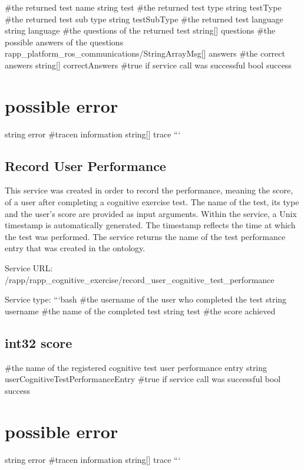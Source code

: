 \#the returned test name string test \#the returned test type string test\-Type \#the returned test sub type string test\-Sub\-Type \#the returned test language string language \#the questions of the returned test string\mbox{[}\mbox{]} questions \#the possible answers of the questions rapp\-\_\-platform\-\_\-ros\-\_\-communications/\-String\-Array\-Msg\mbox{[}\mbox{]} answers \#the correct answers string\mbox{[}\mbox{]} correct\-Answers \#true if service call was successful bool success \section*{possible error}

string error \#tracen information string\mbox{[}\mbox{]} trace ```

\subsection*{Record User Performance}

This service was created in order to record the performance, meaning the score, of a user after completing a cognitive exercise test. The name of the test, its type and the user’s score are provided as input arguments. Within the service, a Unix timestamp is automatically generated. The timestamp reflects the time at which the test was performed. The service returns the name of the test performance entry that was created in the ontology.

Service U\-R\-L\-: {\ttfamily /rapp/rapp\-\_\-cognitive\-\_\-exercise/record\-\_\-user\-\_\-cognitive\-\_\-test\-\_\-performance}

Service type\-: ```bash \#the username of the user who completed the test string username \#the name of the completed test string test \#the score achieved \subsection*{int32 score }

\#the name of the registered cognitive test user performance entry string user\-Cognitive\-Test\-Performance\-Entry \#true if service call was successful bool success \section*{possible error}

string error \#tracen information string\mbox{[}\mbox{]} trace ```

